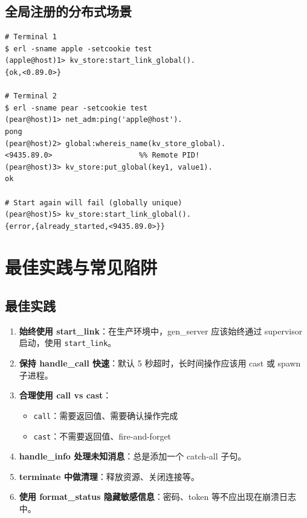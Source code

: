 \documentclass[a4paper,11pt]{article}
\begin{document}
\subsection{全局注册的分布式场景}

\begin{lstlisting}[style=shellstyle]
# Terminal 1
$ erl -sname apple -setcookie test
(apple@host)1> kv_store:start_link_global().
{ok,<0.89.0>}

# Terminal 2
$ erl -sname pear -setcookie test
(pear@host)1> net_adm:ping('apple@host').
pong
(pear@host)2> global:whereis_name(kv_store_global).
<9435.89.0>                    %% Remote PID!
(pear@host)3> kv_store:put_global(key1, value1).
ok

# Start again will fail (globally unique)
(pear@host)5> kv_store:start_link_global().
{error,{already_started,<9435.89.0>}}
\end{lstlisting}


\section{最佳实践与常见陷阱}

\subsection{最佳实践}

\begin{enumerate}[leftmargin=2em]
    \item \textbf{始终使用 start\_link}：在生产环境中，gen\_server 应该始终通过 supervisor 启动，使用 \texttt{start\_link}。

    \item \textbf{保持 handle\_call 快速}：默认 5 秒超时，长时间操作应该用 cast 或 spawn 子进程。

    \item \textbf{合理使用 call vs cast}：
    \begin{itemize}
        \item \texttt{call}：需要返回值、需要确认操作完成
        \item \texttt{cast}：不需要返回值、fire-and-forget
    \end{itemize}

    \item \textbf{handle\_info 处理未知消息}：总是添加一个 catch-all 子句。

    \item \textbf{terminate 中做清理}：释放资源、关闭连接等。

    \item \textbf{使用 format\_status 隐藏敏感信息}：密码、token 等不应出现在崩溃日志中。
\end{enumerate}
\end{document}
